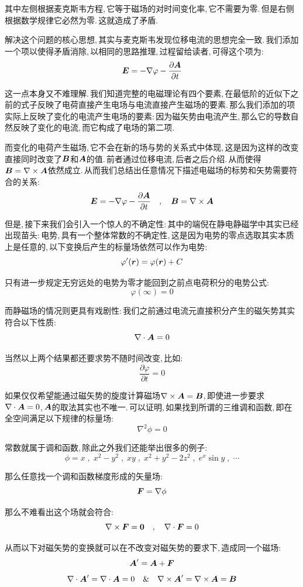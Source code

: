 其中左侧根据麦克斯韦方程,\,它等于磁场的对时间变化率,\,它不需要为零.\,但是右侧根据数学规律它必然为零.\,这就造成了矛盾.

解决这个问题的核心思想,\,其实与麦克斯韦发现位移电流的思想完全一致.\,我们添加一个项以使得矛盾消除,\,以相同的思路推理,\,过程留给读者,\,可得这个项为:
\[\boldsymbol{E}=-\nabla \varphi-\frac{\partial \boldsymbol{A}}{\partial t}\]

这一点本身又不难理解.\,我们知道完整的电磁理论有四个要素,\,在最低阶的近似下之前的式子反映了电荷直接产生电场与电流直接产生磁场的要素.\,那么我们添加的项实际上反映了变化的电流产生电场的要素:\,因为磁矢势由电流产生,\,那么它的导数自然反映了变化的电流,\,而它构成了电场的第二项.

而变化的电荷产生磁场,\,它不会在新的场与势的关系式中体现,\,这是因为这样的改变直接同时改变了$\boldsymbol{B}$和$\boldsymbol{A}$的值.\,前者通过位移电流,\,后者之后介绍.\,从而使得$\boldsymbol{B}=\nabla \times \boldsymbol{A}$依然成立.\,从而我们总结出任意情况下描述电磁场的标势和矢势需要符合的关系:
\[\boldsymbol{E}=-\nabla \varphi-\frac{\partial \boldsymbol{A}}{\partial t}\quad ,\quad\boldsymbol{B}=\nabla \times \boldsymbol{A}\]

但是,\,接下来我们会引入一个惊人的不确定性:\,其中的端倪在静电静磁学中其实已经出现苗头:\,电势,\,具有一个整体常数的不确定性,\,这是因为电势的零点选取其实本质上是任意的,\,以下变换后产生的标量场依然可以作为电势:
\[\varphi'(\boldsymbol{r})=\varphi(\boldsymbol{r})+C\]

只有进一步规定无穷远处的电势为零才能回到之前点电荷积分的电势公式:
\[\varphi(\infty)=0\]

而静磁场的情况则更具有戏剧性:\,我们之前通过电流元直接积分产生的磁矢势其实符合以下性质:
\[\nabla\cdot\boldsymbol{A}=0\]

当然以上两个结果都还要求势不随时间改变,\,比如:
\[\frac{\partial \varphi}{\partial t}=0\]

如果仅仅希望能通过磁矢势的旋度计算磁场$\nabla\times \boldsymbol{A}=\boldsymbol{B}$,\,即使进一步要求$\nabla\cdot\boldsymbol{A}=0$,\,$\boldsymbol{A}$的取法其实也不唯一.\,可以证明,\,如果找到所谓的三维调和函数,\,即在全空间满足以下规律的标量场:
\[\nabla^2\phi=0\]

常数就属于调和函数,\,除此之外我们还能举出很多的例子:
\[\phi=x\;,\;x^2-y^2\;,\;xy\;,\;x^2+y^2-2z^2\;,\;e^{x}\sin y\;,\;\cdots\]

那么任意找一个调和函数梯度形成的矢量场:
\[\boldsymbol{F}=\nabla\phi\]

那么不难看出这个场就会符合:
\[\nabla\times\boldsymbol{F}=\boldsymbol{0}\quad ,\quad \nabla \cdot \boldsymbol{F}=0 \]

从而以下对磁矢势的变换就可以在不改变对磁矢势的要求下,\,造成同一个磁场:
\[\boldsymbol{A}'=\boldsymbol{A}+\boldsymbol{F}\]
\[\nabla\cdot\boldsymbol{A}'=\nabla\cdot\boldsymbol{A} =0\quad \&\quad \nabla \times \boldsymbol{A}'=\nabla\times \boldsymbol{A} =\boldsymbol{B}\]

